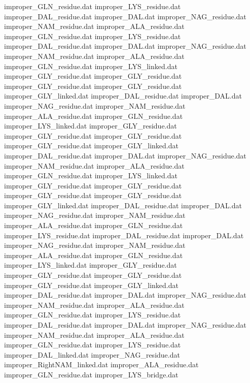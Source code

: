 improper_GLN_residue.dat        
improper_LYS_residue.dat        
improper_DAL_residue.dat        
improper_DAL.dat                
improper_NAG_residue.dat        
improper_NAM_residue.dat        
improper_ALA_residue.dat        
improper_GLN_residue.dat        
improper_LYS_residue.dat        
improper_DAL_residue.dat        
improper_DAL.dat                
improper_NAG_residue.dat        
improper_NAM_residue.dat        
improper_ALA_residue.dat        
improper_GLN_residue.dat        
improper_LYS_linked.dat         
improper_GLY_residue.dat
improper_GLY_residue.dat
improper_GLY_residue.dat
improper_GLY_residue.dat
improper_GLY_linked.dat
improper_DAL_residue.dat        
improper_DAL.dat                
improper_NAG_residue.dat        
improper_NAM_residue.dat        
improper_ALA_residue.dat        
improper_GLN_residue.dat        
improper_LYS_linked.dat         
improper_GLY_residue.dat
improper_GLY_residue.dat
improper_GLY_residue.dat
improper_GLY_residue.dat
improper_GLY_linked.dat
improper_DAL_residue.dat        
improper_DAL.dat                
improper_NAG_residue.dat        
improper_NAM_residue.dat        
improper_ALA_residue.dat        
improper_GLN_residue.dat        
improper_LYS_linked.dat         
improper_GLY_residue.dat
improper_GLY_residue.dat
improper_GLY_residue.dat
improper_GLY_residue.dat
improper_GLY_linked.dat
improper_DAL_residue.dat        
improper_DAL.dat                
improper_NAG_residue.dat        
improper_NAM_residue.dat        
improper_ALA_residue.dat        
improper_GLN_residue.dat        
improper_LYS_residue.dat        
improper_DAL_residue.dat        
improper_DAL.dat                
improper_NAG_residue.dat        
improper_NAM_residue.dat        
improper_ALA_residue.dat        
improper_GLN_residue.dat        
improper_LYS_linked.dat         
improper_GLY_residue.dat
improper_GLY_residue.dat
improper_GLY_residue.dat
improper_GLY_residue.dat
improper_GLY_linked.dat
improper_DAL_residue.dat        
improper_DAL.dat                
improper_NAG_residue.dat        
improper_NAM_residue.dat        
improper_ALA_residue.dat        
improper_GLN_residue.dat        
improper_LYS_residue.dat        
improper_DAL_residue.dat        
improper_DAL.dat                
improper_NAG_residue.dat        
improper_NAM_residue.dat        
improper_ALA_residue.dat        
improper_GLN_residue.dat        
improper_LYS_residue.dat        
improper_DAL_linked.dat         
improper_NAG_residue.dat        
improper_RightNAM_linked.dat    
improper_ALA_residue.dat        
improper_GLN_residue.dat        
improper_LYS_bridge.dat         
